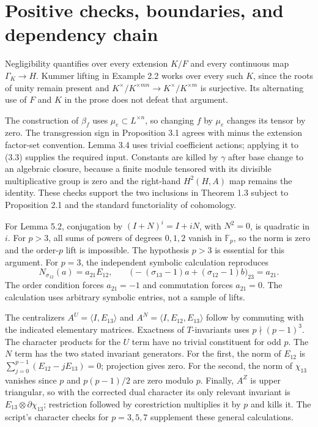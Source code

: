 \documentclass[10pt]{article}
\begin{document}
\section*{Positive checks, boundaries, and dependency chain}
Negligibility quantifies over every extension \(K/F\) and every continuous map \(\Gamma_K\to H\). Kummer lifting in Example 2.2 works over every such \(K\), since the roots of unity remain present and \(K^\times/K^{\times mn}\to K^\times/K^{\times m}\) is surjective. Its alternating use of \(F\) and \(K\) in the prose does not defeat that argument.\par
The construction of \(\beta_f\) uses \(\mu_e\subset L^{\times n}\), so changing \(f\) by \(\mu_e\) changes its tensor by zero. The transgression sign in Proposition 3.1 agrees with minus the extension factor-set convention. Lemma 3.4 uses trivial coefficient actions; applying it to (3.3) supplies the required input. Constants are killed by \(\gamma\) after base change to an algebraic closure, because a finite module tensored with its divisible multiplicative group is zero and the right-hand \(H^2(H,A)\) map remains the identity. These checks support the two inclusions in Theorem 1.3 subject to Proposition 2.1 and the standard functoriality of cohomology.\par
For Lemma 5.2, conjugation by \((I+N)^i=I+iN\), with \(N^2=0\), is quadratic in \(i\). For \(p>3\), all sums of powers of degrees \(0,1,2\) vanish in \(\mathbb F_p\), so the norm is zero and the order-\(p\) lift is impossible. The hypothesis \(p>3\) is essential for this argument. For \(p=3\), the independent symbolic calculation reproduces \[N_{\sigma_{12}}(a)=a_{21}E_{12},\qquad
\bigl(-(\sigma_{13}-1)a+(\sigma_{12}-1)b\bigr)_{23}=a_{21}.\] The order condition forces \(a_{21}=-1\) and commutation forces \(a_{21}=0\). The calculation uses arbitrary symbolic entries, not a sample of lifts.\par
The centralizers \(A^U=\langle I,E_{13}\rangle\) and \(A^N=\langle I,E_{12},E_{13}\rangle\) follow by commuting with the indicated elementary matrices. Exactness of \(T\)-invariants uses \(p\nmid(p-1)^3\). The character products for the \(U\) term have no trivial constituent for odd \(p\). The \(N\) term has the two stated invariant generators. For the first, the norm of \(E_{12}\) is \(\sum_{j=0}^{p-1}(E_{12}-jE_{13})=0\); projection gives zero. For the second, the norm of \(\chi_{13}\) vanishes since \(p\) and \(p(p-1)/2\) are zero modulo \(p\). Finally, \(A^Z\) is upper triangular, so with the corrected dual character its only relevant invariant is \(E_{13}\otimes\partial\chi_{13}\); restriction followed by corestriction multiplies it by \(p\) and kills it. The script’s character checks for \(p=3,5,7\) supplement these general calculations.\par
\end{document}
